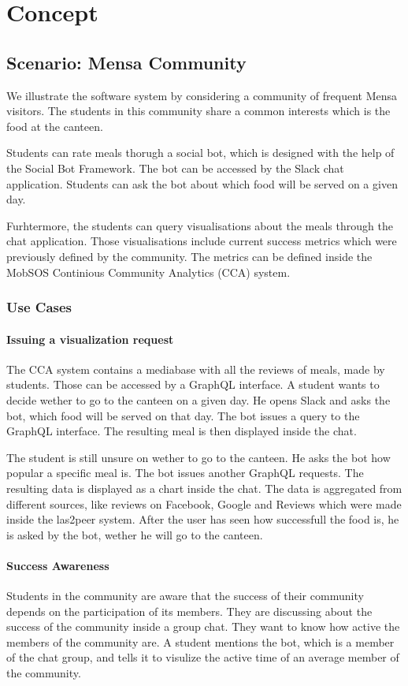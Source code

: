 \chapter{Concept}
\section{Scenario: Mensa Community}
We illustrate the software system by considering a community of frequent Mensa visitors. The students in this community share a common interests which is the food at the canteen.

Students can rate meals thorugh a social bot, which is designed with the help of the Social Bot Framework. The bot can be accessed by the Slack chat application. Students can ask the bot about which food will be served on a given day.

Furhtermore, the students can query visualisations about the meals through the chat application. Those visualisations include current success metrics which were previously defined by the community. The metrics can be defined inside the MobSOS Continious Community Analytics (CCA) system.

\subsection{Use Cases}

\subsubsection{Issuing a visualization request} The CCA system contains a mediabase with all the reviews of meals, made by students. Those can be accessed by a GraphQL interface. A student wants to decide wether to go to the canteen on a given day. He opens Slack and asks the bot, which food will be served on that day. The bot issues a query to the GraphQL interface. The resulting meal is then displayed inside the chat.

The student is still unsure on wether to go to the canteen. He asks the bot how popular a specific meal is. The bot issues another GraphQL requests. The resulting data is displayed as a chart inside the chat. The data is aggregated from different sources, like reviews on Facebook, Google and Reviews which were made inside the las2peer system. After the user has seen how successfull the food is, he is asked by the bot, wether he will go to the canteen.

\subsubsection{Success Awareness} Students in the community are aware that the success of their community depends on the participation of its members. They are discussing about the success of the community inside a group chat. They want to know how active the members of the community are. A student  mentions the bot, which is a member of the chat group, and tells it to visulize the active time of an average member of the community.

